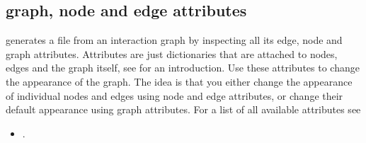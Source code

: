 \documentclass[letterpaper,10pt,english]{sphinxmanual}
\begin{document}
\subsection{graph, node and edge attributes}
\label{\detokenize{Manual:graph-node-and-edge-attributes}}
 generates a  file from an interaction graph by inspecting all its edge, node and graph attributes.
Attributes are just dictionaries that are attached to nodes, edges and the graph itself, see {\hyperref[\detokenize{Installation:installation-networkx}]{}} for an introduction.
Use these attributes to change the appearance of the graph.
The idea is that you either change the appearance of individual nodes and edges using node and edge attributes,
or change their default appearance using graph attributes.
For a list of all available attributes see
\begin{itemize}
\item {} 
.

\end{itemize}
\end{document}
